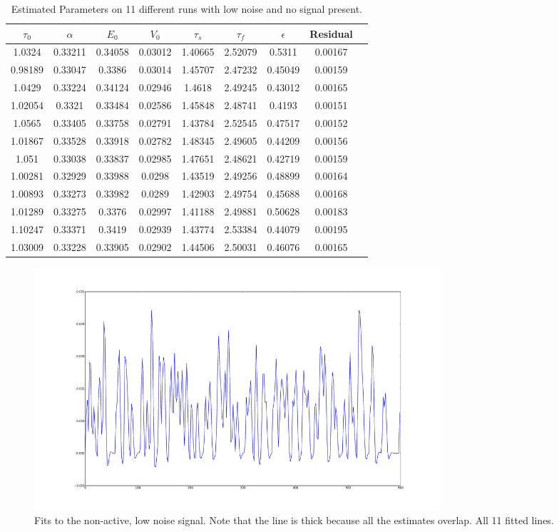 \begin{table}[t]
\centering
\begin{tabular}{|c | c | c | c | c | c | c | c | c |}
\hline
$\tau_0$ & $\alpha$ & $E_0$    & $V_0$    & $\tau_s$ & $\tau_f$ & $\epsilon$  &  Residual   \\
\hline
1.0324 & 0.33211 & 0.34058 & 0.03012 & 1.40665 & 2.52079 & 0.5311 &   0.00167  \\
 0.98189 & 0.33047 & 0.3386 & 0.03014 & 1.45707 & 2.47232 & 0.45049 & 0.00159   \\
 1.0429 & 0.33224 & 0.34124 & 0.02946 & 1.4618 & 2.49245 & 0.43012 &  0.00165   \\
 1.02054 & 0.3321 & 0.33484 & 0.02586 & 1.45848 & 2.48741 & 0.4193 &  0.00151   \\
 1.0565 & 0.33405 & 0.33758 & 0.02791 & 1.43784 & 2.52545 & 0.47517 & 0.00152   \\
 1.01867 & 0.33528 & 0.33918 & 0.02782 & 1.48345 & 2.49605 & 0.44209 &0.00156   \\
 1.051 & 0.33038 & 0.33837 & 0.02985 & 1.47651 & 2.48621 & 0.42719 &  0.00159   \\
 1.00281 & 0.32929 & 0.33988 & 0.0298 & 1.43519 & 2.49256 & 0.48899 & 0.00164   \\
 1.00893 & 0.33273 & 0.33982 & 0.0289 & 1.42903 & 2.49754 & 0.45688 & 0.00168   \\
 1.01289 & 0.33275 & 0.3376 & 0.02997 & 1.41188 & 2.49881 & 0.50628 & 0.00183   \\
 1.10247 & 0.33371 & 0.3419 & 0.02939 & 1.43774 & 2.53384 & 0.44079 & 0.00195   \\
\hline
1.03009 & 0.33228 & 0.33905 & 0.02902 & 1.44506 & 2.50031 & 0.46076 & 0.00165 \\
\hline
\end{tabular}
\caption{Estimated Parameters on 11 different runs with low noise and no signal present.}
\label{tab:NoiseOnlyResults}
\end{table}

\begin{figure}[H]
\centering
\includegraphics[clip=true,trim=6cm 3cm 6cm 3cm,height=9cm]{images/fits_noiseonly}
\caption{Fits to the non-active, low noise signal. Note that the line is thick because all
the estimates overlap. All 11 fitted lines.}
\label{fig:fits_noiseonly}
\end{figure}

